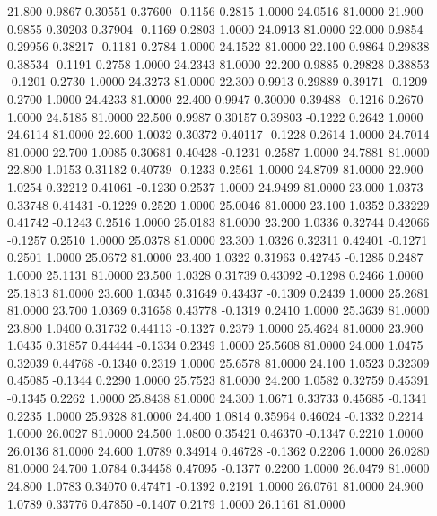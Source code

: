   21.800   0.9867   0.30551   0.37600  -0.1156   0.2815   1.0000  24.0516  81.0000
  21.900   0.9855   0.30203   0.37904  -0.1169   0.2803   1.0000  24.0913  81.0000
  22.000   0.9854   0.29956   0.38217  -0.1181   0.2784   1.0000  24.1522  81.0000
  22.100   0.9864   0.29838   0.38534  -0.1191   0.2758   1.0000  24.2343  81.0000
  22.200   0.9885   0.29828   0.38853  -0.1201   0.2730   1.0000  24.3273  81.0000
  22.300   0.9913   0.29889   0.39171  -0.1209   0.2700   1.0000  24.4233  81.0000
  22.400   0.9947   0.30000   0.39488  -0.1216   0.2670   1.0000  24.5185  81.0000
  22.500   0.9987   0.30157   0.39803  -0.1222   0.2642   1.0000  24.6114  81.0000
  22.600   1.0032   0.30372   0.40117  -0.1228   0.2614   1.0000  24.7014  81.0000
  22.700   1.0085   0.30681   0.40428  -0.1231   0.2587   1.0000  24.7881  81.0000
  22.800   1.0153   0.31182   0.40739  -0.1233   0.2561   1.0000  24.8709  81.0000
  22.900   1.0254   0.32212   0.41061  -0.1230   0.2537   1.0000  24.9499  81.0000
  23.000   1.0373   0.33748   0.41431  -0.1229   0.2520   1.0000  25.0046  81.0000
  23.100   1.0352   0.33229   0.41742  -0.1243   0.2516   1.0000  25.0183  81.0000
  23.200   1.0336   0.32744   0.42066  -0.1257   0.2510   1.0000  25.0378  81.0000
  23.300   1.0326   0.32311   0.42401  -0.1271   0.2501   1.0000  25.0672  81.0000
  23.400   1.0322   0.31963   0.42745  -0.1285   0.2487   1.0000  25.1131  81.0000
  23.500   1.0328   0.31739   0.43092  -0.1298   0.2466   1.0000  25.1813  81.0000
  23.600   1.0345   0.31649   0.43437  -0.1309   0.2439   1.0000  25.2681  81.0000
  23.700   1.0369   0.31658   0.43778  -0.1319   0.2410   1.0000  25.3639  81.0000
  23.800   1.0400   0.31732   0.44113  -0.1327   0.2379   1.0000  25.4624  81.0000
  23.900   1.0435   0.31857   0.44444  -0.1334   0.2349   1.0000  25.5608  81.0000
  24.000   1.0475   0.32039   0.44768  -0.1340   0.2319   1.0000  25.6578  81.0000
  24.100   1.0523   0.32309   0.45085  -0.1344   0.2290   1.0000  25.7523  81.0000
  24.200   1.0582   0.32759   0.45391  -0.1345   0.2262   1.0000  25.8438  81.0000
  24.300   1.0671   0.33733   0.45685  -0.1341   0.2235   1.0000  25.9328  81.0000
  24.400   1.0814   0.35964   0.46024  -0.1332   0.2214   1.0000  26.0027  81.0000
  24.500   1.0800   0.35421   0.46370  -0.1347   0.2210   1.0000  26.0136  81.0000
  24.600   1.0789   0.34914   0.46728  -0.1362   0.2206   1.0000  26.0280  81.0000
  24.700   1.0784   0.34458   0.47095  -0.1377   0.2200   1.0000  26.0479  81.0000
  24.800   1.0783   0.34070   0.47471  -0.1392   0.2191   1.0000  26.0761  81.0000
  24.900   1.0789   0.33776   0.47850  -0.1407   0.2179   1.0000  26.1161  81.0000
